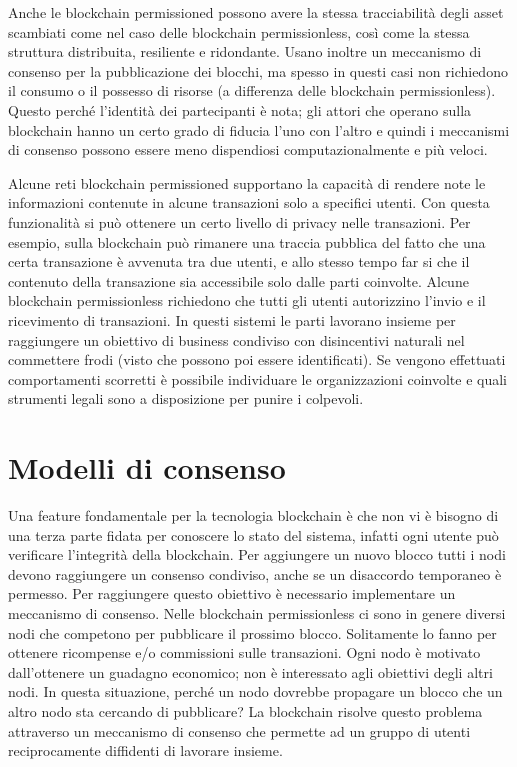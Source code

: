 Anche le blockchain permissioned possono avere la stessa tracciabilità degli asset
scambiati come nel caso delle blockchain permissionless,
così come la stessa struttura distribuita, resiliente e ridondante.
Usano inoltre un meccanismo di consenso per la pubblicazione dei blocchi, ma spesso in questi casi
non richiedono il consumo o il possesso di risorse (a differenza delle blockchain permissionless).
Questo perché l'identità dei partecipanti è nota; gli attori che operano sulla blockchain hanno
un certo grado di fiducia l'uno con l'altro e quindi i meccanismi di consenso possono essere
meno dispendiosi computazionalmente e più veloci.

Alcune reti blockchain permissioned supportano la capacità di rendere note
le informazioni contenute in alcune transazioni solo a specifici utenti.
Con questa funzionalità si può ottenere un certo livello di privacy nelle transazioni. Per esempio,
sulla blockchain può rimanere una traccia pubblica del fatto che una certa transazione è avvenuta tra
due utenti, e allo stesso tempo far si che il contenuto della transazione
sia accessibile solo dalle parti coinvolte.
Alcune blockchain permissionless richiedono che tutti gli utenti autorizzino l'invio e il
ricevimento di transazioni.
In questi sistemi le parti lavorano insieme per raggiungere un obiettivo
di business condiviso con disincentivi naturali nel commettere frodi (visto che possono poi essere identificati).
Se vengono effettuati comportamenti scorretti è possibile individuare le organizzazioni coinvolte e quali
strumenti legali sono a disposizione per punire i colpevoli.


\section{Modelli di consenso}
\label{intro:modelli-consenso}
Una feature fondamentale per la tecnologia blockchain è che non vi è bisogno di una terza parte fidata
per conoscere lo stato del sistema, infatti ogni utente può verificare l'integrità della blockchain.
Per aggiungere un nuovo blocco tutti i nodi devono raggiungere un consenso condiviso, anche se un
disaccordo temporaneo è permesso. Per raggiungere questo obiettivo è necessario implementare un meccanismo
di consenso. Nelle blockchain permissionless ci sono in genere diversi nodi che competono per pubblicare
il prossimo blocco. Solitamente lo fanno per ottenere ricompense e/o commissioni sulle transazioni.
Ogni nodo è motivato dall'ottenere un guadagno economico; non è interessato agli obiettivi degli altri
nodi. In questa situazione, perché un nodo dovrebbe propagare un blocco che un altro
nodo sta cercando di pubblicare? La blockchain risolve questo problema attraverso un meccanismo di
consenso che permette ad un gruppo di utenti reciprocamente diffidenti di lavorare insieme.




